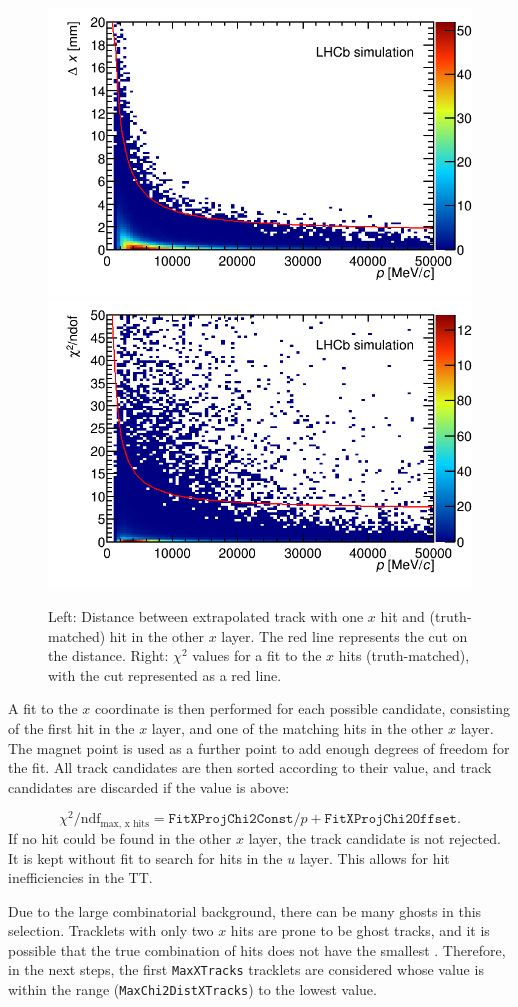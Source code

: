 \begin{figure}[!htbp]
 \begin{center}
  \includegraphics[width=0.49\linewidth]{figures/matchingDist1.png}
  \includegraphics[width=0.49\linewidth]{figures/xChi2Cut1.png}
   \caption{Left: Distance between extrapolated track with one $x$ hit and
   (truth-matched) hit in the other $x$ layer. The red line represents the cut
   on the distance. Right: $\chi^{2}$ values for a fit to the $x$ hits
   (truth-matched), with the cut represented as a red line.
     \label{fig:matchingDist}}
 \end{center}
\end{figure}


A \chisqndf fit to the $x$ coordinate is then performed for each possible candidate, consisting
of the first hit in the $x$ layer, and one of the matching hits in the other $x$
layer. The magnet point is used as a further point to add enough degrees of
freedom for the fit. All track candidates are then sorted according to their
\chisqndf value, and track candidates are discarded if the \chisqndf value is
above:

\begin{equation}
\chi^{2}/\text{ndf}_{\text{max, x hits}} =  \texttt{FitXProjChi2Const} / p + \texttt{FitXProjChi2Offset}.
\end{equation}
If no hit could be found in the other $x$ layer, the track candidate is not rejected. 
It is kept without fit to search for hits in the $u$ layer. This allows for hit inefficiencies in the TT.

Due to the large combinatorial background, there can be many ghosts in this selection.
Tracklets with only two $x$ hits are prone to be ghost tracks, and it is
possible that the true combination of hits does not have the smallest \chisqndf.
Therefore, in the next steps, the first \texttt{MaxXTracks} tracklets are
considered whose \chisqndf value is within the range
(\texttt{MaxChi2DistXTracks}) to the lowest \chisqndf value.

